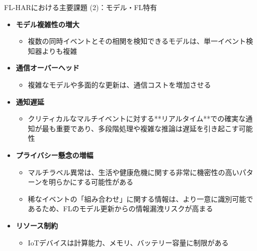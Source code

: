 \documentclass[unicode,12pt,aspectratio=169,dvipdfmx]{beamer}
\begin{document}
\begin{frame}{FL-HARにおける主要課題 (2)：モデル・FL特有}
\begin{itemize}
    \item \textbf{モデル複雑性の増大}
    \begin{itemize}
        \item 複数の同時イベントとその相関を検知できるモデルは、単一イベント検知器よりも複雑
    \end{itemize}
    \item \textbf{通信オーバーヘッド}
    \begin{itemize}
        \item 複雑なモデルや多面的な更新は、通信コストを増加させる
    \end{itemize}
    \item \textbf{通知遅延}
    \begin{itemize}
        \item クリティカルなマルチイベントに対する**リアルタイム**での確実な通知が最も重要であり、多段階処理や複雑な推論は遅延を引き起こす可能性
    \end{itemize}
    \item \textbf{プライバシー懸念の増幅}
    \begin{itemize}
        \item マルチラベル異常は、生活や健康危機に関する非常に機密性の高いパターンを明らかにする可能性がある
        \item 稀なイベントの「組み合わせ」に関する情報は、より一意に識別可能であるため、FLのモデル更新からの情報漏洩リスクが高まる
    \end{itemize}
    \item \textbf{リソース制約}
    \begin{itemize}
        \item IoTデバイスは計算能力、メモリ、バッテリー容量に制限がある
    \end{itemize}
\end{itemize}
\end{frame}
\end{document}
